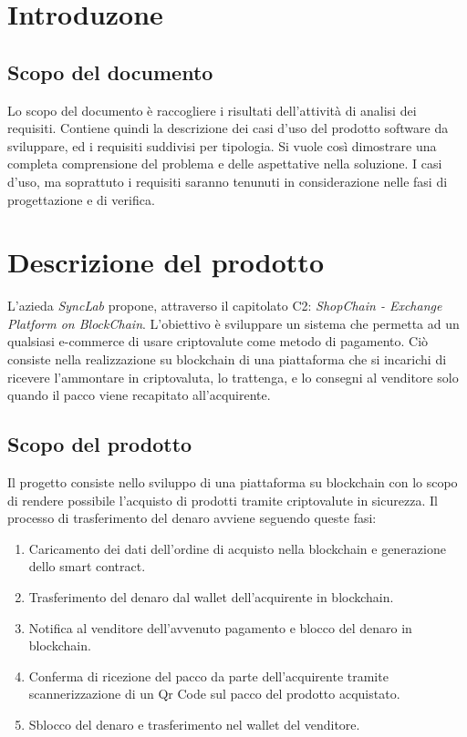 \documentclass[a4paper, 12pt]{article}
\begin{document}
\makefrontpage

\makeversioni

\section{Introduzone}
\subsection{Scopo del documento}
Lo scopo del documento è raccogliere i risultati dell'attività di analisi dei requisiti. Contiene quindi la descrizione dei casi d'uso del prodotto software da sviluppare, ed i requisiti suddivisi per tipologia. Si vuole così dimostrare una completa comprensione del problema e delle aspettative  nella soluzione. I casi d'uso, ma soprattuto i requisiti saranno tenunuti in considerazione nelle fasi di progettazione e di verifica. 

\section{Descrizione del prodotto}
L'azieda \textit{SyncLab} propone, attraverso il capitolato C2: \textit{ShopChain - Exchange Platform on
BlockChain}. L'obiettivo è sviluppare un sistema che permetta ad un qualsiasi e-commerce di usare criptovalute come metodo di pagamento. Ciò consiste nella realizzazione su blockchain di una piattaforma che si incarichi di ricevere l’ammontare in criptovaluta, lo trattenga, e lo consegni al venditore solo quando il pacco viene recapitato all’acquirente.
\subsection{Scopo del prodotto}
Il progetto consiste nello sviluppo di una piattaforma su blockchain con lo scopo di rendere possibile l'acquisto di prodotti tramite criptovalute in sicurezza. Il processo di trasferimento del denaro avviene seguendo queste fasi:
\begin{enumerate}
\item Caricamento dei dati dell'ordine di acquisto nella blockchain e generazione dello smart contract.
\item Trasferimento del denaro dal wallet dell'acquirente in blockchain.
\item Notifica al venditore dell'avvenuto pagamento e blocco del denaro in blockchain.
\item Conferma di ricezione del pacco da parte dell'acquirente tramite scannerizzazione di un Qr Code sul pacco del prodotto acquistato.
\item Sblocco del denaro e trasferimento nel wallet del venditore.
\end{enumerate}
\end{document}
